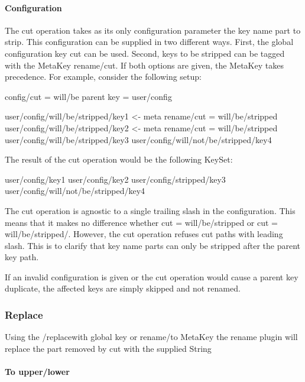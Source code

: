 \paragraph*{Configuration}

The cut operation takes as its only configuration parameter the key name part to strip. This configuration can be supplied in two different ways. First, the global configuration key {\ttfamily cut} can be used. Second, keys to be stripped can be tagged with the Meta\+Key {\ttfamily rename/cut}. If both options are given, the Meta\+Key takes precedence. For example, consider the following setup\+: \begin{DoxyVerb}config/cut = will/be
parent key = user/config

user/config/will/be/stripped/key1           <- meta rename/cut = will/be/stripped
user/config/will/be/stripped/key2           <- meta rename/cut = will/be/stripped
user/config/will/be/stripped/key3
user/config/will/not/be/stripped/key4
\end{DoxyVerb}


The result of the cut operation would be the following Key\+Set\+: \begin{DoxyVerb}user/config/key1
user/config/key2
user/config/stripped/key3
user/config/will/not/be/stripped/key4
\end{DoxyVerb}


The cut operation is agnostic to a single trailing slash in the configuration. This means that it makes no difference whether {\ttfamily cut = will/be/stripped} or {\ttfamily cut = will/be/stripped/}. However, the cut operation refuses cut paths with leading slash. This is to clarify that key name parts can only be stripped after the parent key path.

If an invalid configuration is given or the cut operation would cause a parent key duplicate, the affected keys are simply skipped and not renamed.

\subsubsection*{Replace}

Using the {\ttfamily /replacewith} global key or {\ttfamily rename/to} Meta\+Key the rename plugin will replace the part removed by {\ttfamily cut} with the supplied String

\paragraph*{To upper/lower}

